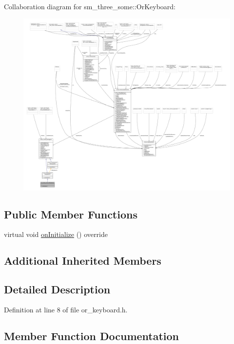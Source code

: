 Collaboration diagram for sm\+\_\+three\+\_\+some\+:\+:Or\+Keyboard\+:
\nopagebreak
\begin{figure}[H]
\begin{center}
\leavevmode
\includegraphics[width=350pt]{classsm__three__some_1_1OrKeyboard__coll__graph}
\end{center}
\end{figure}
\subsection*{Public Member Functions}
\begin{DoxyCompactItemize}
\item 
virtual void \hyperlink{classsm__three__some_1_1OrKeyboard_af49faa7c511ae0232ed0931ce8c85b56}{on\+Initialize} () override
\end{DoxyCompactItemize}
\subsection*{Additional Inherited Members}


\subsection{Detailed Description}


Definition at line 8 of file or\+\_\+keyboard.\+h.



\subsection{Member Function Documentation}
